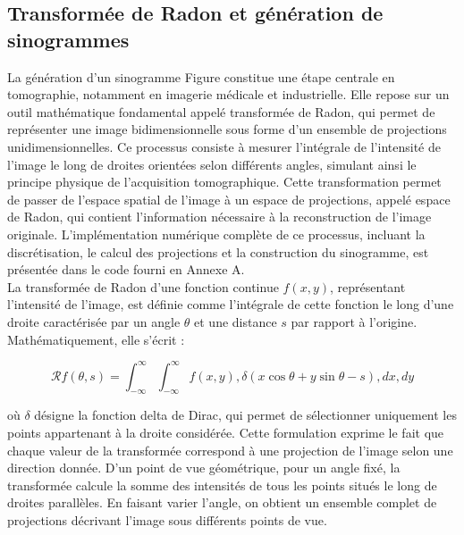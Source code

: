\subsection{Transformée de Radon et génération de sinogrammes}
La génération d'un sinogramme Figure  constitue une étape centrale en tomographie, notamment en imagerie médicale et industrielle. Elle repose sur un outil mathématique fondamental appelé transformée de Radon, qui permet de représenter une image bidimensionnelle sous forme d'un ensemble de projections unidimensionnelles. Ce processus consiste à mesurer l'intégrale de l'intensité de l'image le long de droites orientées selon différents angles, simulant ainsi le principe physique de l'acquisition tomographique. Cette transformation permet de passer de l'espace spatial de l'image à un espace de projections, appelé espace de Radon, qui contient l'information nécessaire à la reconstruction de l'image originale. L'implémentation numérique complète de ce processus, incluant la discrétisation, le calcul des projections et la construction du sinogramme, est présentée dans le code fourni en Annexe A.\vspace{5pt}\\
La transformée de Radon d'une fonction continue $f(x,y)$, représentant l'intensité de l'image, est définie comme l'intégrale de cette fonction le long d'une droite caractérisée par un angle $\theta$ et une distance $s$ par rapport à l'origine. Mathématiquement, elle s'écrit :

$$\mathcal{R}f(\theta, s) = \int_{-\infty}^{\infty} \int_{-\infty}^{\infty} f(x,y),\delta(x\cos\theta + y\sin\theta - s),dx,dy$$

où $\delta$ désigne la fonction delta de Dirac, qui permet de sélectionner uniquement les points appartenant à la droite considérée. Cette formulation exprime le fait que chaque valeur de la transformée correspond à une projection de l'image selon une direction donnée. D'un point de vue géométrique, pour un angle fixé, la transformée calcule la somme des intensités de tous les points situés le long de droites parallèles. En faisant varier l'angle, on obtient un ensemble complet de projections décrivant l'image sous différents points de vue.


